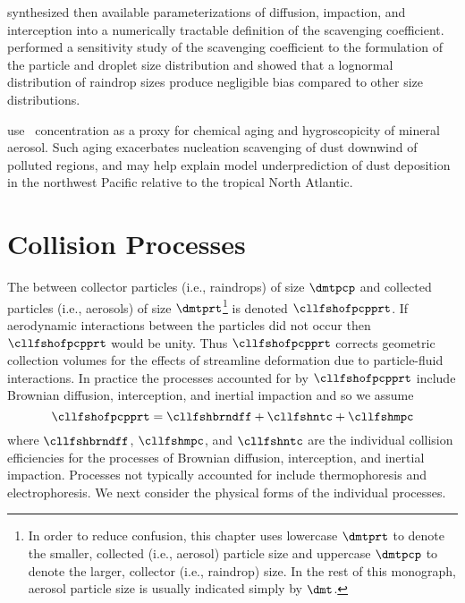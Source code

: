 \documentclass[12pt,twoside]{book}
\begin{document}
\cite{DaH76} synthesized then available parameterizations of
diffusion, impaction, and interception into a numerically tractable
definition of the scavenging coefficient.
\cite{NGD94} performed a sensitivity study of the scavenging
coefficient to the formulation of the particle and droplet size
distribution and showed that a lognormal distribution of raindrop
sizes produce negligible bias compared to other size distributions.

\cite{FHL04} use \SOd\ concentration as a proxy for chemical aging and
hygroscopicity of mineral aerosol.
Such aging exacerbates nucleation scavenging of dust downwind of
polluted regions, and may help explain model underprediction of dust
deposition in the northwest Pacific relative to the tropical North
Atlantic.

\section[Collision Processes]{Collision Processes}\label{sxn:cll_prc}
The  between collector particles (i.e.,
raindrops) of size $\dmtpcp$ and collected particles (i.e., aerosols)
of size $\dmtprt$\footnote{In order to reduce confusion, this chapter
uses lowercase $\dmtprt$ to denote the smaller, collected (i.e.,
aerosol) particle size and uppercase $\dmtpcp$ to denote the larger,
collector (i.e., raindrop) size. 
In the rest of this monograph, aerosol particle size is usually
indicated simply by $\dmt$.} is denoted $\cllfshofpcpprt$. 
If aerodynamic interactions between the particles did not occur then
$\cllfshofpcpprt$ would be unity.
Thus $\cllfshofpcpprt$ corrects geometric collection volumes for the
effects of streamline deformation due to particle-fluid interactions.
In practice the processes accounted for by $\cllfshofpcpprt$ include
Brownian diffusion, interception, and inertial impaction and so we 
assume
\begin{equation}
\cllfshofpcpprt = \cllfshbrndff + \cllfshntc + \cllfshmpc
\label{eqn:cll_fsh_dfn_1}
\end{equation}
where $\cllfshbrndff$, $\cllfshmpc$, and $\cllfshntc$ are the
individual collision efficiencies for the processes of Brownian
diffusion, interception, and inertial impaction.
Processes not typically accounted for include thermophoresis and
electrophoresis. 
We next consider the physical forms of the individual processes.
\end{document}
